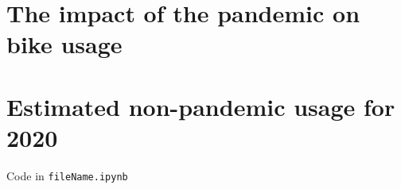 \documentclass[12pt,letterpaper]{article}
\begin{document}
\section{The impact of the pandemic on bike usage}

\begin{comment}
	\begin{figure}[!htbp]
		\texttt{[image: graphs/wireframe.pdf]}
		\caption{mle surface}
		\label{fig:surface}
	\end{figure}
	\begin{figure}[!htbp]
		\texttt{[image: graphs/q2\_xy.png]}
		\texttt{[image: graphs/q2\_hist.png]}
		\caption{Q2 Data}
		\label{fig:mle}
	\end{figure}
\end{comment}


\section{Estimated non-pandemic usage for 2020}




	Code in \texttt{fileName.ipynb}




%

\begin{comment}
	
	\begin{figure}[!htbp]
		\texttt{[image: graphics/wireframe.pdf]}
		\caption{mle surface}
		\label{fig:surface}
	\end{figure}
	\begin{figure}[!htbp]
		\texttt{[image: graphics/q2\_xy.png]}
		\texttt{[image: graphics/q2\_hist.png]}
		\caption{Q2 Data}
		\label{fig:mle}
	\end{figure}
\end{comment}

\begin{comment}
	\begin{sidewaystable}
	\end{sidewaystable}
	
	\begin{landscape}
		
	\end{landscape}
	
\end{comment}
\end{document}
